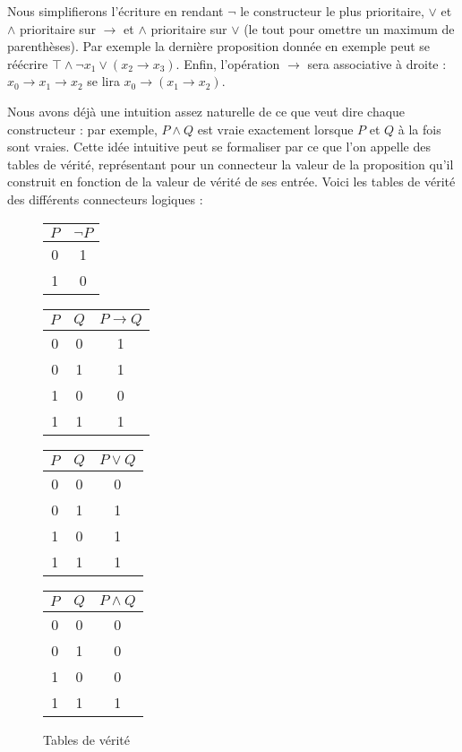 \begin{rmk}
    Nous simplifierons l'écriture en rendant $\lnot$ le constructeur le plus prioritaire, $\lor$ et $\land$ prioritaire sur $\to$ et $\land$ prioritaire sur $\lor$ (le tout pour omettre un maximum de parenthèses). Par exemple la dernière proposition donnée en exemple peut se réécrire $\top\land \lnot x_1 \lor (x_2\to x_3)$. Enfin, l'opération $\to$ sera associative à droite : $x_0 \to x_1 \to x_2$ se lira $x_0 \to (x_1\to x_2)$.
\end{rmk}

Nous avons déjà une intuition assez naturelle de ce que veut dire chaque constructeur : par exemple, $P\land Q$ est vraie exactement lorsque $P$ et $Q$ à la fois sont vraies. Cette idée intuitive peut se formaliser par ce que l'on appelle des tables de vérité, représentant pour un connecteur la valeur de la proposition qu'il construit en fonction de la valeur de vérité de ses entrée. Voici les tables de vérité des différents connecteurs logiques :

{\begin{figure}[htb]
\centering
\begin{tabular}{|c|c|}
    \hline
     $P$ & $\lnot P$ \\ \hline\hline
     0 & 1 \\ \hline
     1 & 0 \\ \hline
\end{tabular}
\quad
\begin{tabular}{|c|c|c|}
    \hline
     $P$ & $Q$ & $P\to Q$ \\ \hline\hline
     0 & 0 & 1\\ \hline
     0 & 1 & 1\\ \hline
     1 & 0 & 0\\ \hline
     1 & 1 & 1\\ \hline
\end{tabular}
\quad
\begin{tabular}{|c|c|c|}
    \hline
     $P$ & $Q$ & $P\lor Q$  \\ \hline\hline
     0 & 0 & 0 \\ \hline
     0 & 1 & 1 \\ \hline
     1 & 0 & 1 \\ \hline
     1 & 1 & 1\\ \hline
\end{tabular}
\quad
\begin{tabular}{|c|c|c|}
    \hline
     $P$ & $Q$ & $P\land Q$ \\ \hline\hline
     0 & 0 & 0 \\ \hline
     0 & 1 & 0 \\ \hline
     1 & 0 & 0 \\ \hline
     1 & 1 & 1 \\ \hline
\end{tabular}
\caption{Tables de vérité}
\end{figure}}

